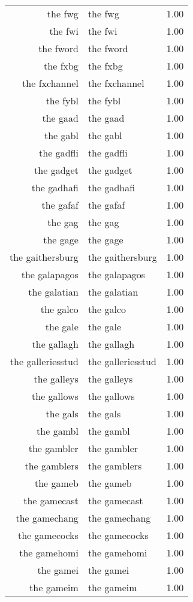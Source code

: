 \begin{table}[ht]
\begin{tabular}{rlr}
  the fwg & the fwg & 1.00 \\ 
  the fwi & the fwi & 1.00 \\ 
  the fword & the fword & 1.00 \\ 
  the fxbg & the fxbg & 1.00 \\ 
  the fxchannel & the fxchannel & 1.00 \\ 
  the fybl & the fybl & 1.00 \\ 
  the gaad & the gaad & 1.00 \\ 
  the gabl & the gabl & 1.00 \\ 
  the gadfli & the gadfli & 1.00 \\ 
  the gadget & the gadget & 1.00 \\ 
  the gadhafi & the gadhafi & 1.00 \\ 
  the gafaf & the gafaf & 1.00 \\ 
  the gag & the gag & 1.00 \\ 
  the gage & the gage & 1.00 \\ 
  the gaithersburg & the gaithersburg & 1.00 \\ 
  the galapagos & the galapagos & 1.00 \\ 
  the galatian & the galatian & 1.00 \\ 
  the galco & the galco & 1.00 \\ 
  the gale & the gale & 1.00 \\ 
  the gallagh & the gallagh & 1.00 \\ 
  the galleriesstud & the galleriesstud & 1.00 \\ 
  the galleys & the galleys & 1.00 \\ 
  the gallows & the gallows & 1.00 \\ 
  the gals & the gals & 1.00 \\ 
  the gambl & the gambl & 1.00 \\ 
  the gambler & the gambler & 1.00 \\ 
  the gamblers & the gamblers & 1.00 \\ 
  the gameb & the gameb & 1.00 \\ 
  the gamecast & the gamecast & 1.00 \\ 
  the gamechang & the gamechang & 1.00 \\ 
  the gamecocks & the gamecocks & 1.00 \\ 
  the gamehomi & the gamehomi & 1.00 \\ 
  the gamei & the gamei & 1.00 \\ 
  the gameim & the gameim & 1.00 \\ 

\end{tabular}
\end{table}
